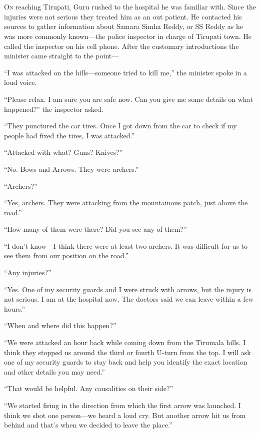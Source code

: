 \chapter{}

\lettrine{O}{n} reaching Tirupati, Guru rushed to the hospital he was familiar
with. Since the injuries were not serious they treated him as an out patient. He
contacted his sources to gather information about Samara Simha Reddy, or SS
Reddy as he was more commonly known—the police inspector in charge of Tirupati
town. He called the inspector on his cell phone. After the customary
introductions the minister came straight to the point—

“I was attacked on the hills—someone tried to kill me,” the minister spoke in
a loud voice.

“Please relax. I am sure you are safe now. Can you give me some details on what
happened?” the inspector asked.

“They punctured the car tires. Once I got down from the car to check if my
people had fixed the tires, I was attacked.”

“Attacked with what? Guns? Knives?”

“No. Bows and Arrows. They were archers.”

“Archers?”

“Yes, archers. They were attacking from the mountainous patch, just above the
road.”

“How many of them were there? Did you see any of them?”

“I don't know—I think there were at least two archers. It was difficult for us
to see them from our position on the road.”

“Any injuries?”

“Yes. One of my security guards and I were struck with arrows, but the injury is
not serious. I am at the hospital now. The doctors said we can leave within a
few hours.”

“When and where did this happen?”

“We were attacked an hour back while coming down from the Tirumala hills. I
think they stopped us around the third or fourth U-turn from the top. I will ask
one of my security guards to stay back and help you identify the exact location
and other details you may need.”

“That would be helpful. Any causalities on their side?”

“We started firing in the direction from which the first arrow was launched. I
think we shot one person—we heard a loud cry. But another arrow hit us from
behind and that's when we decided to leave the place.”

